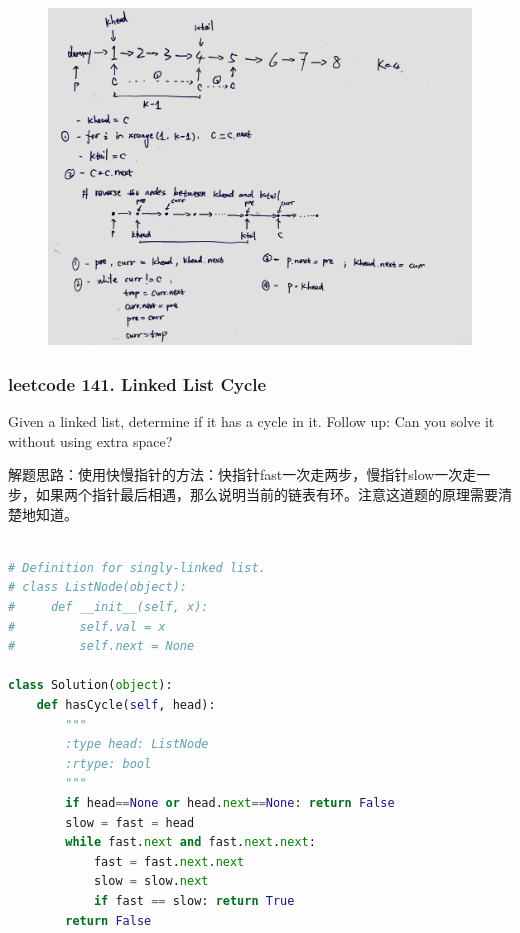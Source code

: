 \documentclass[a4paper,10pt]{article}
\begin{document}
\begin{figure}[h]
    \includegraphics[width=\textwidth]{leetcode138.jpg}
    \centering \\
\end{figure}




\subsubsection{leetcode 141. Linked List Cycle}
Given a linked list, determine if it has a cycle in it. Follow up: Can you solve it without using extra space? \\

\begin{CJK*}{UTF8}{gbsn}
\noindent 解题思路：使用快慢指针的方法：快指针fast一次走两步，慢指针slow一次走一步，如果两个指针最后相遇，那么说明当前的链表有环。注意这道题的原理需要清楚地知道。\\
\end{CJK*}

\begin{lstlisting}[language=Python, caption=Problem141. Linked List Cycle]

# Definition for singly-linked list.
# class ListNode(object):
#     def __init__(self, x):
#         self.val = x
#         self.next = None

class Solution(object):
    def hasCycle(self, head):
        """
        :type head: ListNode
        :rtype: bool
        """
        if head==None or head.next==None: return False
        slow = fast = head
        while fast.next and fast.next.next:
            fast = fast.next.next
            slow = slow.next
            if fast == slow: return True
        return False
\end{lstlisting}
\end{document}
